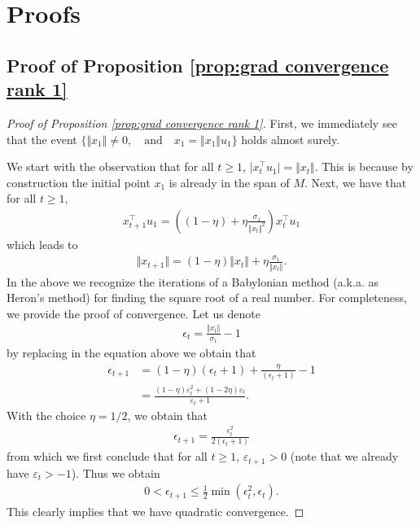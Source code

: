 \section{Proofs}\label{ref:appA}

\subsection{Proof of Proposition \ref{prop:grad convergence rank 1}}

\begin{proof}[Proof of Proposition \ref{prop:grad convergence rank 1}]
 First, we immediately see that the event $\lbrace \Vert x_1 \Vert \neq 0, \quad \text{and} \quad x_1 = \Vert x_1 \Vert u_1 \rbrace$ holds almost surely. 

We start with the observation that for all $t \ge 1$, $\vert x_t^\top u_1 \vert = \Vert x_t \Vert $. This is because by construction the initial point $x_1$ is already in the span of $M$. Next, we have that for all $t\ge1$, 
\begin{align*}
    x_{t+1}^\top u_1 = \left( (1- \eta)  + \eta \frac{\sigma_1}{\Vert x_t \Vert^2} \right) x_t^\top u_1 
\end{align*}
which leads to 
\begin{align*}
    \Vert x_{t+1} \Vert =   (1- \eta) \Vert x_t \Vert  + \eta \frac{\sigma_1}{\Vert x_t \Vert}. 
\end{align*}
In the above we recognize the iterations of a Babylonian method (a.k.a. as Heron's method) for finding the square root of a real number. For completeness, we provide the proof of convergence. Let us denote 
\begin{align*}
    \epsilon_t = \frac{\Vert x_t \Vert}{\sigma_1} - 1
\end{align*}
by replacing in the equation above we obtain that 
\begin{align*}
    \epsilon_{t+1} & = (1- \eta)(\epsilon_t + 1) + \frac{\eta}{(\epsilon_t + 1)} - 1 \\
    & = \frac{(1-\eta)\varepsilon_t^2 + (1- 2 \eta)\varepsilon_t}{\varepsilon_t + 1}.
\end{align*}
With the choice $\eta = 1/2$, we obtain that 
\begin{align*}
    \epsilon_{t+1} = \frac{\epsilon_t^2 }{2(\epsilon_t + 1)}
\end{align*}
from which we first conclude that for all $t\ge 1$, $\varepsilon_{t+1} > 0$ (note that we already have $\varepsilon_t > - 1 $). Thus we obtain 
\begin{align*}
    0 < \epsilon_{t+1} \le \frac{1}{2}\min\left( \epsilon_t^2, \epsilon_t  \right).
\end{align*}
This clearly implies that we have quadratic convergence. 
\end{proof}





